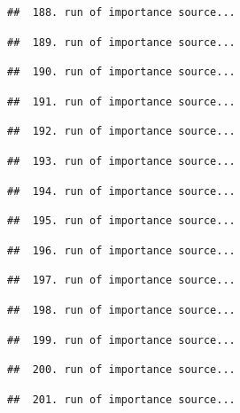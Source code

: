 \documentclass[
]{article}
\begin{document}
\begin{verbatim}
##  188. run of importance source...
\end{verbatim}

\begin{verbatim}
##  189. run of importance source...
\end{verbatim}

\begin{verbatim}
##  190. run of importance source...
\end{verbatim}

\begin{verbatim}
##  191. run of importance source...
\end{verbatim}

\begin{verbatim}
##  192. run of importance source...
\end{verbatim}

\begin{verbatim}
##  193. run of importance source...
\end{verbatim}

\begin{verbatim}
##  194. run of importance source...
\end{verbatim}

\begin{verbatim}
##  195. run of importance source...
\end{verbatim}

\begin{verbatim}
##  196. run of importance source...
\end{verbatim}

\begin{verbatim}
##  197. run of importance source...
\end{verbatim}

\begin{verbatim}
##  198. run of importance source...
\end{verbatim}

\begin{verbatim}
##  199. run of importance source...
\end{verbatim}

\begin{verbatim}
##  200. run of importance source...
\end{verbatim}

\begin{verbatim}
##  201. run of importance source...
\end{verbatim}
\end{document}
